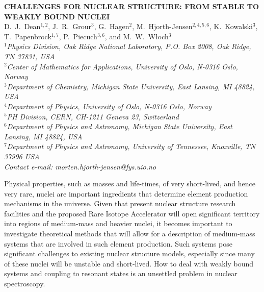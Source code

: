 \documentclass[10pt]{article}
\begin{document}
                                          

\begin{center}                                 

{\bf                                                       
CHALLENGES FOR NUCLEAR STRUCTURE: FROM STABLE TO WEAKLY BOUND NUCLEI\\ } 
\vspace{4ex}                                               
D.~J.~Dean$^{1,2}$, J.~R.~Grour$^{3}$, G.~Hagen$^{2}$, M.~Hjorth-Jensen$^{2,4,5,6}$,
K.~Kowalski$^{3}$, T.~Papenbrock$^{1,7}$, P.~Piecuch$^{3,6}$, and M.~W.~W{\l}och$^{3}$\\
\vspace{2ex}                                          
{\sl                                                  
$^1$Physics Division, Oak Ridge National Laboratory,
P.O. Box 2008, Oak Ridge, TN 37831, USA\\
$^2$Center of Mathematics for Applications, University of Oslo, N-0316 Oslo, Norway\\
$^3$Department of Chemistry, Michigan State University,
East Lansing, MI 48824, USA\\
$^4$Department of Physics, University of Oslo, N-0316 Oslo, Norway\\
$^5$PH Division, CERN, CH-1211 Geneva 23, Switzerland\\
$^6$Department of Physics and Astronomy,
Michigan State University, East Lansing, MI 48824, USA\\
$^7$Department of Physics and Astronomy, University of Tennessee,
Knoxville, TN 37996 USA\\

}                                                             
\vspace{1ex}                                                 
{\small \sl                                  
Contact e-mail: morten.hjorth-jensen@fys.uio.no\\} 
\end{center}                             
\vspace{5mm}
Physical properties, such as masses and life-times,
of very short-lived, and hence very rare, nuclei are important
ingredients that determine element production mechanisms in
the universe. Given that present nuclear structure research facilities
and the proposed Rare Isotope Accelerator will open significant
territory into regions of medium-mass and heavier nuclei,
it becomes important to investigate theoretical methods that will allow
for a description of medium-mass systems that are involved in such
element production. Such systems pose significant
challenges to existing nuclear structure models, especially since many of
these nuclei will be unstable and short-lived. How to deal with weakly
bound systems and coupling to resonant states is an unsettled problem in
nuclear spectroscopy. 
\end{document}
